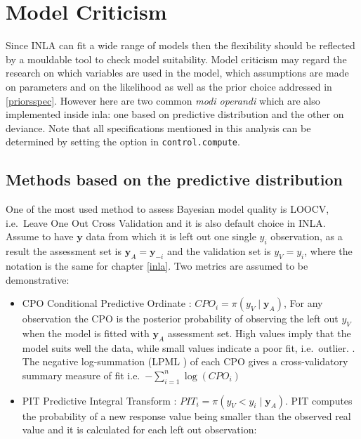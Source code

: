 \documentclass[
  12pt,
  a4paper,
  oneside]{book}
\newcommand{\passthrough}[1]{#1}
\providecommand{\tightlist}{%
  \setlength{\itemsep}{0pt}\setlength{\parskip}{0pt}}
\theoremstyle{definition}
\theoremstyle{definition}
\theoremstyle{definition}
\theoremstyle{remark}
\begin{document}
\hypertarget{criticism}{%
\section{Model Criticism}\label{criticism}}

Since INLA can fit a wide range of models then the flexibility should be reflected by a mouldable tool to check model suitability. Model criticism may regard the research on which variables are used in the model, which assumptions are made on parameters and on the likelihood as well as the prior choice addressed in \ref{priorsspec}. However here are two common \emph{modi operandi} which are also implemented inside inla: one based on predictive distribution and the other on deviance. Note that all specifications mentioned in this analysis can be determined by setting the option in \passthrough{\lstinline!control.compute!}.

\hypertarget{predbase}{%
\subsection{Methods based on the predictive distribution}\label{predbase}}

One of the most used method to assess Bayesian model quality is LOOCV, i.e.~Leave One Out Cross Validation and it is also default choice in INLA. Assume to have \(\boldsymbol{y}\) data from which it is left out one single \(y_i\) observation, as a result the assessment set is \(\boldsymbol{y}_{A} = \boldsymbol{y}_{-i}\) and the validation set is \({y}_{V} = y_{i}\), where the notation is the same for chapter \ref{inla}. Two metrics are assumed to be demonstrative:

\begin{itemize}
\tightlist
\item
  CPO Conditional Predictive Ordinate \citep{petit1990}: \(CPO_{i} = \pi(y_{V} \mid \boldsymbol{y}_{A})\), For any observation the CPO is the posterior probability of observing the left out \(y_{V}\) when the model is fitted with \(\boldsymbol{y}_A\) assessment set. High values imply that the model suits well the data, while small values indicate a poor fit, i.e.~outlier. \citep{Bayesian_INLA_Rubio}. The negative log-summation (LPML \citet{lpml}) of each CPO gives a cross-validatory summary measure of fit \citep{wang2018bayesian} i.e.~\(-\sum_{i=1}^{n} \log \left(C P O_{i}\right)\)
\item
  PIT Predictive Integral Transform \citep{marshall2007}: \(PIT_{i} = \pi(y_{V} < y_{i} \mid \boldsymbol{y}_{A})\). PIT computes the probability of a new response value being smaller than the observed real value and it is calculated for each left out observation:
\end{itemize}
\end{document}
